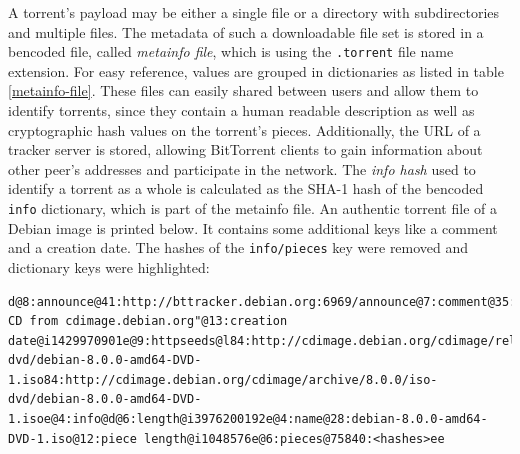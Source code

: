 \documentclass[10pt, a4paper, twoside, headsepline]{scrbook}
\renewcommand{\_}{\origunderscore\allowbreak}
\begin{document}
A torrent's payload may be either a single file or a directory with subdirectories and multiple files. The metadata of such a downloadable file set is stored in a bencoded file, called \emph{metainfo file}, which is using the \texttt{.torrent} file name extension. For easy reference, values are grouped in dictionaries as listed in table \ref{metainfo-file}. These files can easily shared between users and allow them to identify torrents, since they contain a human readable description as well as cryptographic hash values on the torrent's pieces. Additionally, the URL of a tracker server is stored, allowing BitTorrent clients to gain information about other peer's addresses and participate in the network. The \emph{info hash} used to identify a torrent as a whole is calculated as the SHA-1 hash of the bencoded \texttt{info} dictionary, which is part of the metainfo file. An authentic torrent file of a Debian image is printed below. It contains some additional keys like a comment and a creation date. The hashes of the \texttt{info/pieces} key were removed and dictionary keys were highlighted:
\begin{lstlisting}
d@8:announce@41:http://bttracker.debian.org:6969/announce@7:comment@35:"Debian CD from cdimage.debian.org"@13:creation date@i1429970901e@9:httpseeds@l84:http://cdimage.debian.org/cdimage/release/8.0.0/iso-dvd/debian-8.0.0-amd64-DVD-1.iso84:http://cdimage.debian.org/cdimage/archive/8.0.0/iso-dvd/debian-8.0.0-amd64-DVD-1.isoe@4:info@d@6:length@i3976200192e@4:name@28:debian-8.0.0-amd64-DVD-1.iso@12:piece length@i1048576e@6:pieces@75840:<hashes>ee
\end{lstlisting}
\end{document}
